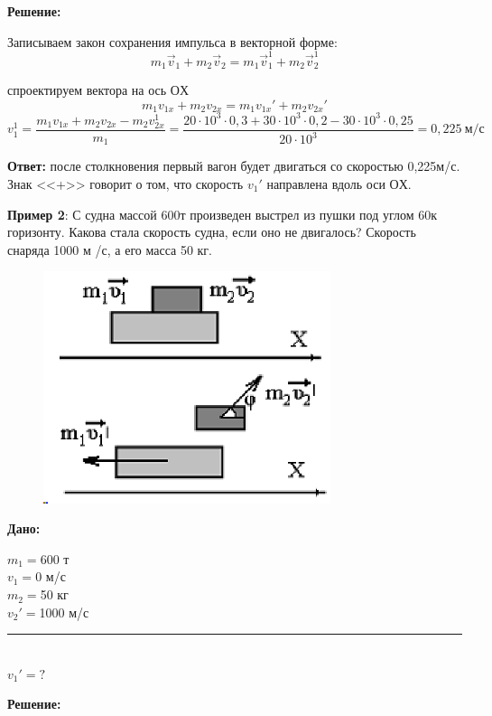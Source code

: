 \documentclass[a6paper, 11pt]{diss_4}
\renewcommand{\'}{\,'}
\begin{document}
  \textbf{Решение:}

Записываем закон сохранения импульса в векторной форме:
\[
m_1\vec{v}_1+m_2\vec{v}_2=m_1\vec{v}_1^1+m_2\vec{v}_2^1
\]

спроектируем вектора на ось $ОХ$
\[
m_1 v_{1x}+m_2 v_{2x}=m_1 v_{1x}'+m_2 {v}_{2x}'
\]
\[
v_1^1=\frac{m_1 v_{1x}+m_2 v_{2x}-m_2 v_{2x}^1}{m_1}=
\frac{20\cdot10^3\cdot0,3+30\cdot10^3\cdot0,2-30\cdot10^3\cdot0,25}{20\cdot10^3}=
0,225\ м/с
\]

\textbf{Ответ:} после столкновения первый вагон будет двигаться со скоростью 0,225м/с.
Знак <<+>>  говорит о том, что скорость ${v_1}'$ направлена вдоль оси $ОХ$.

 \textbf{Пример 2}: С судна массой 600т произведен выстрел из пушки под углом
60\textdegree к горизонту. Какова стала скорость судна, если оно не двигалось?
Скорость снаряда 1000 м /с, а его масса 50 кг.


\begin{figure}
\includegraphics[width=0.75\textwidth]{img/img_28.eps}
\end{figure}

\vspace*{2cm}
\hspace{1cm}\textbf{Дано:}\hspace{.3cm}
\parbox[t]{4cm}{
$m_1=$600 т\\
$v_1=$0 м/с\\
$m_2=$50 кг\\
$v_2'=$1000 м/с\\
\rule{4cm}{.4pt}\\
$v_1'=?$\\
}



\vspace{10pt}
  \textbf{Решение:}
\end{document}
